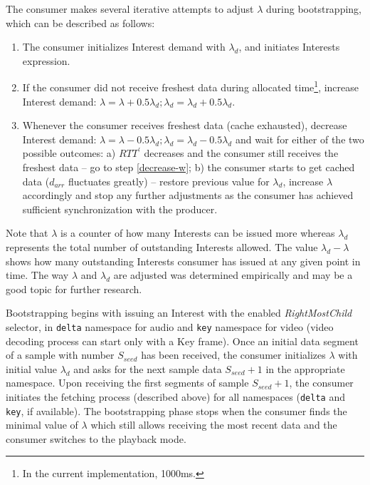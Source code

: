 \documentclass{icn/sig-alternate-2013} %
\newcommand{\wConcept}{Interest demand}
\begin{document}
The consumer makes several iterative attempts to adjust $\lambda$ during bootstrapping, which can be described as follows:
\begin{enumerate}
\item The consumer initializes \wConcept{} with $\lambda_d$, and initiates Interests expression.
\item If the consumer did not receive freshest data during allocated time\footnote{In the current implementation, 1000ms.}, increase \wConcept{}: $\lambda=\lambda+0.5\lambda_d; \lambda_d = \lambda_d+0.5\lambda_d$.
\item \label{decrease-w} Whenever the consumer receives freshest data (cache exhausted), decrease \wConcept{}: $\lambda=\lambda-0.5\lambda_d; \lambda_d = \lambda_d-0.5\lambda_d$ and wait for either of the two possible outcomes:
a) $RTT^\prime$ decreases and the consumer still receives the freshest data -- go to step \ref{decrease-w};
b) the consumer starts to get cached data ($d_{arr}$ fluctuates greatly) -- restore previous value for $\lambda_d$, increase $\lambda$ accordingly and stop any further adjustments as the consumer has achieved sufficient synchronization with the producer.
\end{enumerate}

Note that $\lambda$ is a counter of how many Interests can be issued more whereas $\lambda_d$ represents the total number of outstanding Interests allowed. The value $\lambda_d-\lambda$ shows how many outstanding Interests consumer has issued at any given point in time. The way $\lambda$ and $\lambda_d$ are adjusted was determined empirically and may be a good topic for further research.

Bootstrapping begins with issuing an Interest with the enabled \textit{RightMostChild} selector, in \texttt{delta} namespace for audio and \texttt{key} namespace for video (video decoding process can start only with a Key frame). %
Once an initial data segment of a sample with number $S_{seed}$ has been received, the consumer initializes $\lambda$ with initial value $\lambda_d$ and asks for the next sample data $S_{seed}+1$ in the appropriate namespace. Upon receiving the first segments of sample $S_{seed}+1$, the consumer initiates the fetching process (described above) for all namespaces (\texttt{delta} and \texttt{key}, if available). The bootstrapping phase stops when the consumer finds the minimal value of $\lambda$ which still allows receiving the most recent data and the consumer switches to the playback mode.
\end{document}
